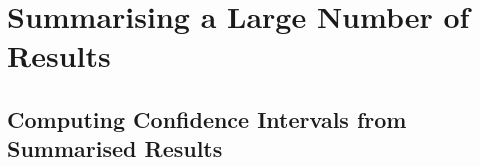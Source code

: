 \section{Summarising a Large Number of Results}
\label{sec:summarise-script}
\lstset{language=bash}


\subsection{Computing Confidence Intervals from Summarised Results}
\label{sec:compute-ci}
\lstset{language=Python}



